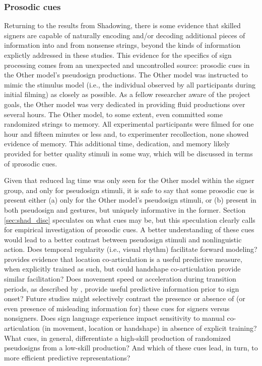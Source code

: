         \subsubsection{Prosodic cues}
            Returning to the results from Shadowing, there is some evidence that skilled signers are capable of naturally encoding and/or decoding additional pieces of information into and from nonsense strings, beyond the kinds of information explictly addressed in these studies. This evidence for the specifics of sign processing comes from an unexpected and uncontrolled source: prosodic cues in the Other model’s pseudosign productions. The Other model was instructed to mimic the stimulus model (i.e., the individual observed by all participants during initial filming) as closely as possible. As a fellow researcher aware of the project goals, the Other model was very dedicated in providing fluid productions over several hours. The Other model, to some extent, even committed some randomized strings to memory. All experimental participants were filmed for one hour and fifteen minutes or less and, to experimenter recollection, none showed evidence of memory. This additional time, dedication, and memory likely provided for better quality stimuli in some way, which will be discussed in terms of \i{prosodic cues}. \par
            Given that reduced lag time was only seen for the Other model within the signer group, and only for pseudosign stimuli, it is safe to say that some prosodic cue is present either (a) only for the Other model’s pseudosign stimuli, or (b) present in both pseudosign and gestures, but uniquely informative in the former. Section \ref{sec:shad_disc} speculates on what cues may be, but this speculation clearly calls for empirical investigation of prosodic cues. A better understanding of these cues would lead to a better contrast between pseudosign stimuli and nonlinguistic action. Does temporal regularity (i.e., visual rhythm) facilitate forward modeling?  provides evidence that location co-articulation is a useful predictive measure, when explicitly trained as such, but could handshape co-articulation provide similar facilitation? Does movement speed or acceleration during transition periods, as described by , provide useful predictive information prior to sign onset? Future studies might selectively contrast the presence or absence of (or even presence of misleading information for) these cues for signers versus nonsigners. Does sign language experience impact sensitivity to manual co-articulation (in movement, location or handshape) in absence of explicit training? What cues, in general, differentiate a high-skill production of randomized pseudosigns from a low-skill production? And which of these cues lead, in turn, to more efficient predictive representations?
